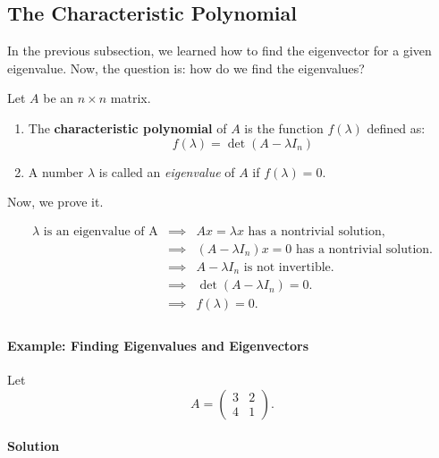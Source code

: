 \documentclass[a4paper,12pt]{article}
\begin{document}
\Large \subsection{The Characteristic Polynomial}
\begin{frame}
\small

\small In the previous subsection, we learned how to find the eigenvector for a given eigenvalue. Now, the question is: how do we find the eigenvalues?

\begin{tcolorbox}[title=Definition,colframe=blue!70!black, colback=blue!5!white]
Let \( A \) be an \( n \times n \) matrix.
\begin{enumerate}
    \item The \textbf{characteristic polynomial} of \( A \) is the function \( f(\lambda) \) defined as:
    \[
    f(\lambda) = \det(A - \lambda I_n)
    \]
    \item A number \( \lambda \) is called an \textit{eigenvalue} of \( A \) if \( f(\lambda) = 0 \).
\end{enumerate}
\end{tcolorbox}
Now, we prove it.

\[
\begin{array}{lcl}
    \lambda \text{ is an eigenvalue of A} & \implies & Ax = \lambda x \text{ has a nontrivial solution,} \\
    &\implies &(A - \lambda I_n)x = 0 \text{ has a nontrivial solution.} \\
    &\implies &A - \lambda I_n \text{ is not invertible.} \\
    &\implies & \det(A - \lambda I_n) = 0.               \\
    &\implies & f(\lambda) = 0.               \\
\end{array}
\]

\newpage
\paragraph{Example: Finding Eigenvalues and Eigenvectors}

Let 
\[
A = \begin{pmatrix} 3 & 2 \\ 4 & 1 \end{pmatrix}.
\]
\paragraph{Solution} 


\end{frame}
\end{document}
